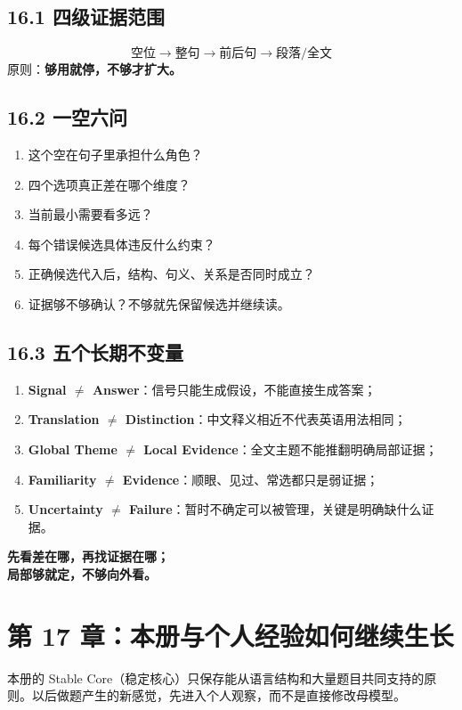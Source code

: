\documentclass[11pt,a4paper]{ctexart}
\newcommand{\kw}[1]{\textbf{#1}}
\begin{document}
\subsection{16.1 四级证据范围}
\[
\boxed{
\text{空位}
\rightarrow
\text{整句}
\rightarrow
\text{前后句}
\rightarrow
\text{段落/全文}
}
\]
原则：\kw{够用就停，不够才扩大。}

\subsection{16.2 一空六问}
\begin{enumerate}
  \item 这个空在句子里承担什么角色？
  \item 四个选项真正差在哪个维度？
  \item 当前最小需要看多远？
  \item 每个错误候选具体违反什么约束？
  \item 正确候选代入后，结构、句义、关系是否同时成立？
  \item 证据够不够确认？不够就先保留候选并继续读。
\end{enumerate}

\subsection{16.3 五个长期不变量}
\begin{enumerate}
  \item \kw{Signal $\neq$ Answer}：信号只能生成假设，不能直接生成答案；
  \item \kw{Translation $\neq$ Distinction}：中文释义相近不代表英语用法相同；
  \item \kw{Global Theme $\neq$ Local Evidence}：全文主题不能推翻明确局部证据；
  \item \kw{Familiarity $\neq$ Evidence}：顺眼、见过、常选都只是弱证据；
  \item \kw{Uncertainty $\neq$ Failure}：暂时不确定可以被管理，关键是明确缺什么证据。
\end{enumerate}

\begin{exam}[考场压缩口令]
\centering
\Large
\textbf{先看差在哪，\quad 再找证据在哪；\\
局部够就定，\quad 不够向外看。}
\end{exam}

\section{第 17 章：本册与个人经验如何继续生长}
本册的 Stable Core（稳定核心）只保存能从语言结构和大量题目共同支持的原则。以后做题产生的新感觉，先进入个人观察，而不是直接修改母模型。
\end{document}
